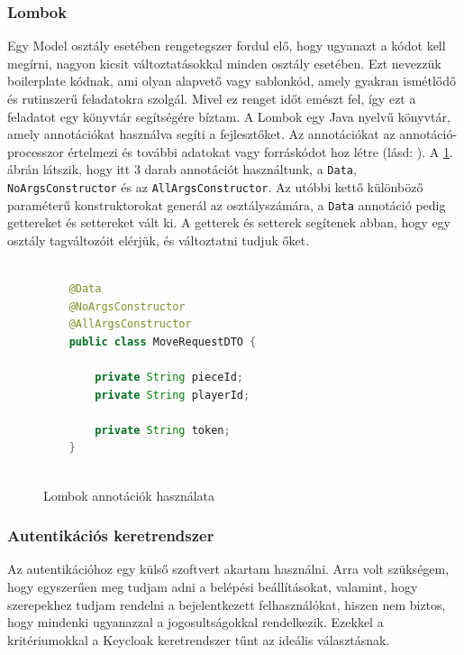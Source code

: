 \documentclass[a4paper,twoside]{article}
\begin{document}
\subsubsection{Lombok}
Egy Model osztály esetében rengetegszer fordul elő, hogy ugyanazt a kódot kell megírni, nagyon kicsit változtatásokkal minden osztály esetében. Ezt nevezzük boilerplate kódnak, ami olyan alapvető vagy sablonkód, amely gyakran ismétlődő és rutinszerű feladatokra szolgál. Mivel ez renget időt emészt fel, így ezt a feladatot egy könyvtár segítségére bíztam. 
A Lombok \cite{lombok}  egy Java nyelvű könyvtár, amely
annotációkat használva segíti a fejlesztőket. Az annotációkat az annotáció-processzor értelmezi és további adatokat vagy forráskódot hoz létre (lásd: \cite{lombokWork}). A \ref{lombok}. ábrán látszik, hogy itt 3 darab annotációt használtunk, a \verb|Data|, \verb|NoArgsConstructor| és az \verb|AllArgsConstructor|. Az utóbbi kettő különböző paraméterű konstruktorokat generál az osztályszámára, a \verb|Data| annotáció pedig gettereket és settereket vált ki. A getterek és setterek segítenek abban, hogy egy osztály tagváltozóit elérjük, és változtatni tudjuk őket.
\begin{figure}
	\caption{Lombok annotációk használata}
	\centering
	\begin{lstlisting}[language=java]
		
	@Data
	@NoArgsConstructor
	@AllArgsConstructor
	public class MoveRequestDTO {
		
		private String pieceId;
		private String playerId;
		
		private String token;
	}
		
	\end{lstlisting}
	\label{lombok}
\end{figure} 

\subsubsection{Autentikációs keretrendszer}\label{auth-tech}
Az autentikációhoz egy külső szoftvert akartam használni. Arra volt szükségem, hogy egyszerűen meg tudjam adni a belépési beállításokat, valamint, hogy szerepekhez tudjam rendelni a bejelentkezett felhasználókat, hiszen nem biztos, hogy mindenki ugyanazzal a jogosultságokkal rendelkezik. Ezekkel a kritériumokkal a Keycloak\cite{keycloak} keretrendszer tűnt az ideális választásnak. 
\end{document}
